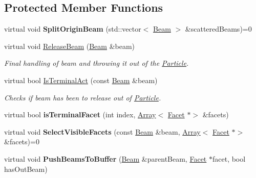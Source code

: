 \subsection*{Protected Member Functions}
\begin{DoxyCompactItemize}
\item 
\mbox{\label{class_scattering_a4b891bd6dcd276e42f2697cf6cd35f2b}} 
virtual void {\bfseries Split\+Origin\+Beam} (std\+::vector$<$ \mbox{\hyperlink{class_beam}{Beam}} $>$ \&scattered\+Beams)=0
\item 
virtual void \mbox{\hyperlink{class_scattering_a6fa2a9f952577d5310d8a8e617f2c8f8}{Release\+Beam}} (\mbox{\hyperlink{class_beam}{Beam}} \&beam)
\begin{DoxyCompactList}\small\item\em Final handling of beam and throwing it out of the \mbox{\hyperlink{class_particle}{Particle}}. \end{DoxyCompactList}\item 
virtual bool \mbox{\hyperlink{class_scattering_abe93cd1898e52b1601c96735020454fe}{Is\+Terminal\+Act}} (const \mbox{\hyperlink{class_beam}{Beam}} \&beam)
\begin{DoxyCompactList}\small\item\em Checks if beam has been to release out of \mbox{\hyperlink{class_particle}{Particle}}. \end{DoxyCompactList}\item 
\mbox{\label{class_scattering_a9223cd083c3567785d7aa6cf1c48264f}} 
virtual bool {\bfseries is\+Terminal\+Facet} (int index, \mbox{\hyperlink{class_array}{Array}}$<$ \mbox{\hyperlink{class_facet}{Facet}} $\ast$$>$ \&facets)
\item 
\mbox{\label{class_scattering_a3e69b875202c73dfff77d7c4e7f9cc2a}} 
virtual void {\bfseries Select\+Visible\+Facets} (const \mbox{\hyperlink{class_beam}{Beam}} \&beam, \mbox{\hyperlink{class_array}{Array}}$<$ \mbox{\hyperlink{class_facet}{Facet}} $\ast$$>$ \&facets)=0
\item 
\mbox{\label{class_scattering_a8c8b0bcf34e7b810fdc589130adec1d6}} 
virtual void {\bfseries Push\+Beams\+To\+Buffer} (\mbox{\hyperlink{class_beam}{Beam}} \&parent\+Beam, \mbox{\hyperlink{class_facet}{Facet}} $\ast$facet, bool has\+Out\+Beam)
\item 

\end{DoxyCompactItemize}
